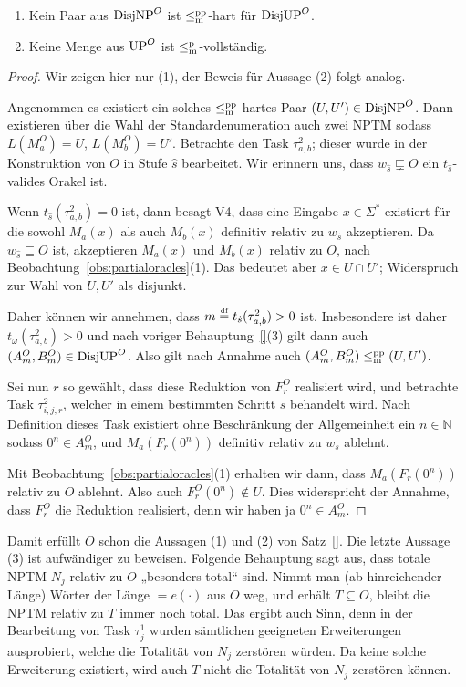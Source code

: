 \begin{claim}
    \begin{enumerate}
        \item Kein Paar aus $\mathrm{DisjNP}^O$ ist $\leq_\mathrm{m}^\mathrm{pp}$-hart für $\mathrm{DisjUP}^O$.
        \item Keine Menge aus $\mathrm{UP}^O$ ist $\leq_\mathrm{m}^\mathrm{p}$-vollständig.
    \end{enumerate}
\end{claim}
\begin{proof}
    Wir zeigen hier nur (1), der Beweis für Aussage (2) folgt analog.

    Angenommen es existiert ein solches $\leq_\mathrm{m}^\mathrm{pp}$-hartes Paar $(U, U')\in\mathrm{DisjNP}^O$.
    Dann existieren über die Wahl der Standardenumeration auch zwei NPTM sodass $L(M_a^O)=U$, $L(M_b^O)=U'$.
    Betrachte den Task $\tau^2_{a,b}$; dieser wurde in der Konstruktion von $O$ in Stufe $\hat{s}$ bearbeitet.
    Wir erinnern uns, dass $w_{\hat{s}}\sqsubsetneq O$ ein $t_{\hat{s}}$-valides Orakel ist.

    Wenn $t_{\hat{s}}(\tau^2_{a,b})=0$ ist, dann besagt V4, dass eine Eingabe $x\in\Sigma^*$ existiert für die sowohl $M_a(x)$ als auch $M_b(x)$ definitiv relativ zu $w_{\hat{s}}$ akzeptieren. Da $w_{\hat{s}}\sqsubseteq O$ ist, akzeptieren $M_a(x)$ und $M_b(x)$ relativ zu $O$, nach Beobachtung~\ref{obs:partialoracles}(1).
    Das bedeutet aber $x\in U\cap U'$; Widerspruch zur Wahl von $U, U'$ als disjunkt.

    Daher können wir annehmen, dass $m\stackrel{\text{\smash{\tiny df}}}{=}  t_{\hat{s}}(\tau^2_{a,b})>0$ ist.
    Insbesondere ist daher $t_\omega(\tau^2_{a,b})>0$ und nach voriger Behauptung~\ref{}(3) gilt dann auch $(A^O_m, B^O_m)\in\mathrm{DisjUP}^O$. Also gilt nach Annahme auch $(A^O_m, B^O_m) \leq_\mathrm{m}^\mathrm{pp} (U, U')$.
    
    Sei nun $r$ so gewählt, dass diese Reduktion von $F^O_r$ realisiert wird, und betrachte Task  $\tau^2_{i,j,r}$, welcher in einem bestimmten Schritt $s$ behandelt wird.
    Nach Definition dieses Task existiert ohne Beschränkung der Allgemeinheit ein $n\in\mathbb N$ sodass $0^n\in A_m^O$, und $M_a(F_r(0^n))$ definitiv relativ zu $w_s$ ablehnt.

    Mit Beobachtung~\ref{obs:partialoracles}(1) erhalten wir dann, dass $M_a(F_r(0^n))$ relativ zu $O$ ablehnt. Also auch $F^O_r(0^n)\not\in U$. Dies widerspricht der Annahme, dass $F_r^O$ die Reduktion realisiert, denn wir haben ja $0^n\in A_m^O$.
\end{proof}

Damit erfüllt $O$ schon die Aussagen (1) und (2) von Satz~\ref{}. Die letzte Aussage (3) ist aufwändiger zu beweisen.
Folgende Behauptung sagt aus, dass totale NPTM $N_j$ relativ zu $O$ „besonders total“ sind. Nimmt man (ab hinreichender Länge) Wörter der Länge $=e(\cdot)$ aus $O$ weg, und erhält $T\subseteq O$, bleibt die NPTM relativ zu $T$ immer noch total. Das ergibt auch Sinn, denn in der Bearbeitung von Task $\tau^1_j$ wurden sämtlichen geeigneten Erweiterungen ausprobiert, welche die Totalität von $N_j$ zerstören würden. Da keine solche Erweiterung existiert, wird auch $T$ nicht die Totalität von $N_j$ zerstören können.

